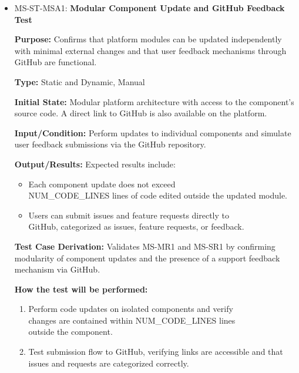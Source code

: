 \documentclass[12pt, titlepage]{article}
\begin{document}
\begin{itemize} 

  \item MS-ST-MSA1: \textbf{Modular Component Update and GitHub Feedback Test}
  \begin{mdframed}[linewidth=0.5mm] 
    \textbf{Purpose:} Confirms that platform modules can be updated independently with minimal external changes and that user feedback mechanisms through GitHub are functional. \par
    \textbf{Type:} Static and Dynamic, Manual \par 
    \textbf{Initial State:} Modular platform architecture with access to the component’s source code. A direct link to GitHub is also available on the platform. \par 
    \textbf{Input/Condition:} Perform updates to individual components and simulate user feedback submissions via the GitHub repository. \par 
    \textbf{Output/Results:} Expected results include: 
    \begin{itemize} 
      \item Each component update does not exceed \\NUM\_CODE\_LINES lines of code edited outside the updated module.
      \item Users can submit issues and feature requests directly to \\GitHub, categorized as issues, feature requests, or feedback.
    \end{itemize} \par
    \textbf{Test Case Derivation:} Validates MS-MR1 and MS-SR1 by confirming modularity of component updates and the presence of a support feedback mechanism via GitHub. \par
    \textbf{How the test will be performed:} 
    \begin{enumerate}[noitemsep] 
      \item Perform code updates on isolated components and verify \\changes are contained within NUM\_CODE\_LINES lines \\outside the component. 
      \item Test submission flow to GitHub, verifying links are accessible and that issues and requests are categorized correctly. 
    \end{enumerate} 
  \end{mdframed}


\end{itemize}
\end{document}
